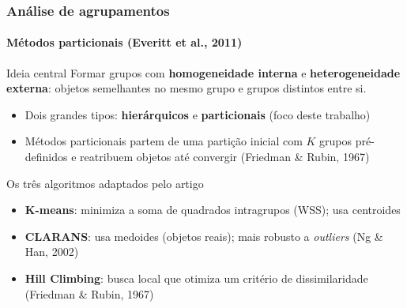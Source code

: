 \documentclass[brazilian,11pt]{beamer}
\begin{document}
\begin{frame}[shrink=8]
    \frametitle{Análise de agrupamentos}
    \framesubtitle{Métodos particionais (Everitt et al., 2011)}

    \begin{block}{Ideia central}
        \small
        Formar grupos com \textbf{homogeneidade interna} e \textbf{heterogeneidade externa}: objetos semelhantes no mesmo grupo e grupos distintos entre si.
    \end{block}

    \begin{itemize}
        \footnotesize
        \item Dois grandes tipos: \textbf{hierárquicos} e \textbf{particionais} (foco deste trabalho)
        \item Métodos particionais partem de uma partição inicial com $K$ grupos pré-definidos e reatribuem objetos até convergir (Friedman \& Rubin, 1967)
    \end{itemize}

    \begin{block}{Os três algoritmos adaptados pelo artigo}
        \footnotesize
        \begin{itemize}
            \item \textbf{K-means}: minimiza a soma de quadrados intragrupos (WSS); usa centroides
            \item \textbf{CLARANS}: usa medoides (objetos reais); mais robusto a \textit{outliers} (Ng \& Han, 2002)
            \item \textbf{Hill Climbing}: busca local que otimiza um critério de dissimilaridade (Friedman \& Rubin, 1967)
        \end{itemize}
    \end{block}
\end{frame}
\end{document}
